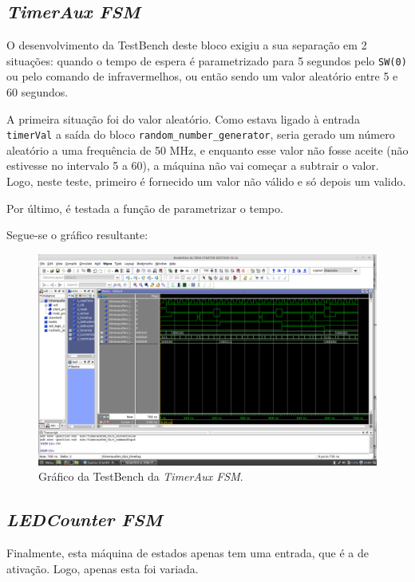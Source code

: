 \documentclass[a4paper,11pt,onecolumn]{report}
\begin{document}
\subsection{\textit{TimerAux FSM}}

O desenvolvimento da TestBench deste bloco exigiu a sua separação em 2 situações: quando o tempo de espera é parametrizado para 5 segundos pelo \texttt{SW(0)} ou pelo comando de infravermelhos, ou então sendo um valor aleatório entre 5 e 60 segundos.

A primeira situação foi do valor aleatório. Como estava ligado à entrada \texttt{timerVal} a saída do bloco \texttt{random\_number\_generator}, seria gerado um número aleatório a uma frequência de 50 MHz, e enquanto esse valor não fosse aceite (não estivesse no intervalo 5 a 60), a máquina não vai começar a subtrair o valor. Logo, neste teste, primeiro é fornecido um valor não válido e só depois um valido.

Por último, é testada a função de parametrizar o tempo.

Segue-se o gráfico resultante:

\begin{figure}[h]
\centerline{\includegraphics[scale=0.33]{Images/TimerAuxFSMTB}}
\caption{Gráfico da TestBench da \textit{TimerAux FSM}.}
\label{figtimerfsmtb}
\end{figure}

\subsection{\textit{LEDCounter FSM}}

Finalmente, esta máquina de estados apenas tem uma entrada, que é a de ativação. Logo, apenas esta foi variada.
\end{document}
